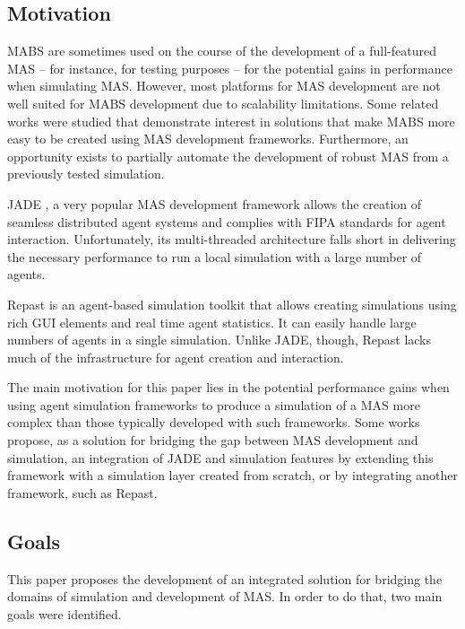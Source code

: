\documentclass[a4paper,twoside]{article}
\begin{document}
\subsection{Motivation}
MABS are sometimes used on the course of the development of a full-featured MAS -- for instance, for testing purposes -- for the potential gains in performance when simulating MAS. 
However, most platforms for MAS development are not well suited for MABS development due to scalability limitations\cite{mengistu2008scalability}. Some related works were studied that demonstrate interest in solutions that make MABS more easy to be created using MAS development frameworks. Furthermore, an opportunity exists to partially automate the development of robust MAS from a previously tested simulation.

JADE \cite{bellifemine2007developing}, a very popular MAS development framework allows the creation of seamless distributed agent systems and complies with FIPA standards for agent interaction. Unfortunately, its multi-threaded architecture falls short in delivering the necessary performance to run a local simulation with a large number of agents.

Repast \cite{collier2003repast} is an agent-based simulation toolkit that allows creating simulations using rich GUI elements and real time agent statistics. It can easily handle large numbers of agents in a single simulation. Unlike JADE, though, Repast lacks much of the infrastructure for agent creation and interaction.

The main motivation for this paper lies in the potential performance gains when using agent simulation frameworks to produce a simulation of a MAS more complex than those typically developed with such frameworks. Some works \cite{garcia2011misia,gormer2011jrep} propose, as a solution for bridging the gap between MAS development and simulation, an integration of JADE and simulation features by extending this framework with a simulation layer created from scratch, or by integrating another framework, such as Repast.

\subsection{Goals}
This paper proposes the development of an integrated solution for bridging the domains of simulation and development of MAS. In order to do that, two main goals were identified.
\end{document}
